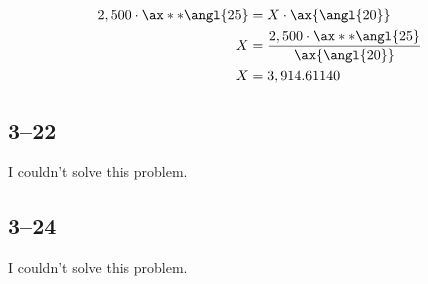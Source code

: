 \documentclass[a4paper, 12pt, reqno]{amsart}
\numberwithin{equation}{section}
\begin{document}
\begin{equation}\nonumber
    \begin{aligned}
        2,500 \cdot \ax**{\angl{25}} &= X \cdot \ax{\angl{20}}      \\
        X &= \frac{2,500 \cdot \ax**{\angl{25}}}{\ax{\angl{20}}}    \\
        X &= 3,914.61140
    \end{aligned}
\end{equation}

\subsection*{3--22}

I couldn't solve this problem.

\subsection*{3--24}

I couldn't solve this problem.
\end{document}
